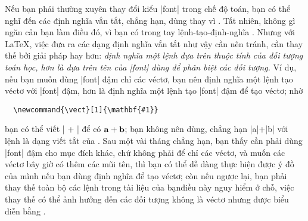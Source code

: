 Nếu bạn phải thường xuyên thay đổi kiểu |font| trong chế độ toán,
bạn có thể nghĩ đến các định nghĩa vắn tắt, chẳng hạn, dùng 
thay vì . Tất nhiên, không gì ngăn cản bạn làm điều đó,
vì bạn có trong tay lệnh-tạo-định-nghĩa . Nhưng với \LaTeX{},
việc đưa ra các dạng định nghĩa vắn tắt như vậy cần nên tránh, cần thay thế
bởi giải pháp hay hơn: \emph{định nghĩa một lệnh dựa trên \emph{thuộc tính của
đối tượng toán học}, hơn là dựa trên tên của |font| dùng để phân biệt
các đối tượng.} Ví dụ, nếu bạn muốn dùng |font| đậm chỉ các véctơ, bạn
nên định nghĩa một lệnh tạo véctơ với |font| đậm, hơn là định nghĩa một
lệnh tạo |font| đậm để tạo véctơ; nhờ

\medskip
\begin{verbatim}
  \newcommand{\vect}[1]{\mathbf{#1}}
\end{verbatim}

\medskip\noindent
bạn có thể viết | + | để có $\vect{a}+\vect{b}$;
bạn không nên dùng, chẳng hạn |{a}|+|{b}| với lệnh 
là dạng viết tắt của .
Sau một vài tháng chẳng hạn, bạn thấy cần phải dùng |font| đậm cho mục đích khác,
chứ không phải để chỉ các véctơ, và muốn các véctơ bây giờ có thêm các mũi tên,
thì bạn có thể dễ dàng thực hiện được ý đồ của mình nếu bạn dùng định nghĩa
 để tạo véctơ; còn nếu ngược lại, bạn phải thay thế toàn bộ các lệnh
 trong tài liệu của bạn\mdash điều này nguy hiểm ở chỗ, việc thay thế
có thể ảnh hưởng đến các đối tượng không là véctơ nhưng được biểu diễn bằng
.


